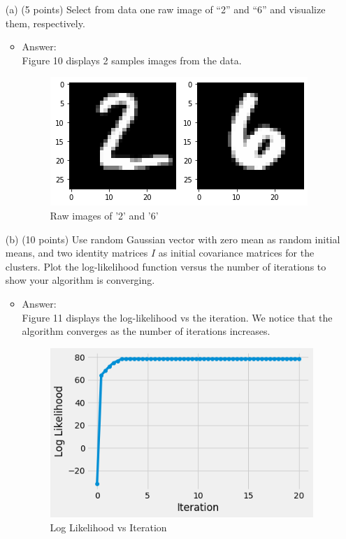 \documentclass[twoside,10pt]{article}
\begin{document}
\begin{enumerate}

\item[(a)] (5 points) Select from data one raw image of ``2'' and ``6'' and visualize them, respectively. 

 \begin{itemize}
\item Answer:\\
Figure 10 displays 2 samples images from the data.
\begin{figure}[h!]
\begin{center}
\includegraphics[totalheight=2in]{Images/Q3a.png}
\end{center}
\caption{Raw images of '2' and '6'}
\end{figure}

\end{itemize} 

\item[(b)] (10 points) Use random Gaussian vector with zero mean as random initial means, and two identity matrices $I$ as initial covariance matrices for the clusters. Plot the log-likelihood function versus the number of iterations to show your algorithm is converging.

 \begin{itemize}
\item Answer:\\
Figure 11 displays the log-likelihood vs the iteration. We notice that the algorithm converges as the number of iterations increases.
\begin{figure}[h!]
\begin{center}
\includegraphics[totalheight=2in]{Images/Q3b.png}
\end{center}
\caption{Log Likelihood vs Iteration}
\end{figure}


\end{itemize}
\end{enumerate}
\end{document}
